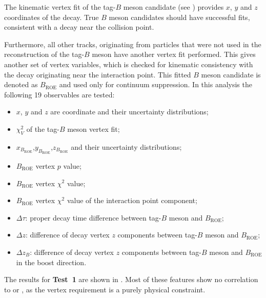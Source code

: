 The kinematic vertex fit of the tag-$B$ meson candidate (see ) provides $x$, $y$ and $z$ coordinates of the decay.
True $B$ meson candidates should have successful fits, consistent with a decay near the collision point.

Furthermore, all other tracks, originating from particles that were not used in the reconstruction of the tag-$B$ meson have another vertex fit performed.
This gives another set of vertex variables, which is checked for kinematic consistency with the decay originating near the interaction point.
This fitted $B$ meson candidate is denoted as $B_{\mathrm{ROE}}$ and used only for continuum suppression.
In this analysis the following 19 observables are tested:
\begin{itemize}
    \item $x$, $y$ and $z$ are coordinate and their uncertainty distributions;
    \item $\chi_V^2$ of the tag-$B$ meson vertex fit;
    \item $x_{B_{\mathrm{ROE}}}$,$y_{B_{\mathrm{ROE}}}$,$z_{B_{\mathrm{ROE}}}$ and their uncertainty distributions;
    \item $B_{\mathrm{ROE}}$ vertex $p$ value;
    \item $B_{\mathrm{ROE}}$ vertex $\chi^2$ value;
    \item $B_{\mathrm{ROE}}$ vertex $\chi^2$ value of the interaction point component;
    \item $\Delta \tau$: proper decay time difference between tag-$B$ meson and $B_{\mathrm{ROE}}$;
    \item $\Delta z$: difference of decay vertex $z$ components between tag-$B$ meson and $B_{\mathrm{ROE}}$;
    \item $\Delta z_B$: difference of decay vertex $z$ components between tag-$B$ meson and $B_{\mathrm{ROE}}$ in the boost direction.
\end{itemize}

The results for \textbf{Test~1} are shown in .
Most of these features show no correlation to \EB or \Estar, as the vertex requirement is a purely physical constraint.

